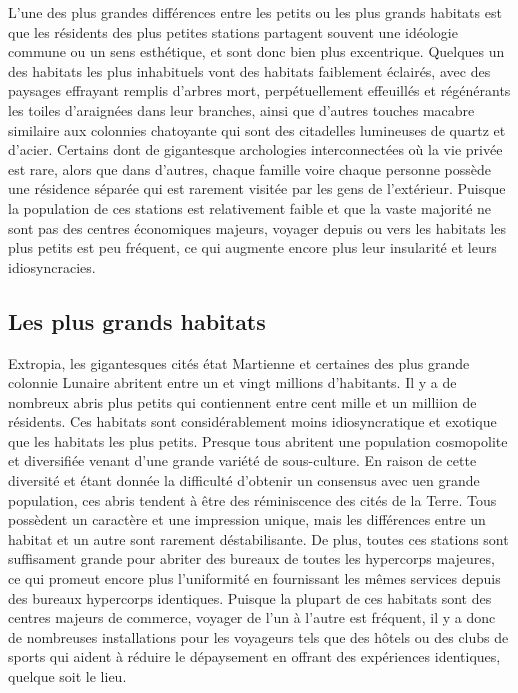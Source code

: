                L'une des plus grandes différences entre les petits ou les plus grands habitats est que les résidents des plus petites stations partagent souvent une idéologie commune ou un sens esthétique, et sont donc bien plus excentrique. Quelques un des habitats les plus inhabituels vont des habitats faiblement éclairés, avec des paysages effrayant remplis d'arbres mort, perpétuellement effeuillés et régénérants les toiles d'araignées dans leur branches, ainsi que d'autres touches macabre similaire aux colonnies chatoyante qui sont des citadelles lumineuses de quartz et d'acier. Certains dont de gigantesque archologies interconnectées où la vie privée est rare, alors que dans d'autres, chaque famille voire chaque personne possède une résidence séparée qui est rarement visitée par les gens de l'extérieur. Puisque la population de ces stations est relativement faible et que la vaste majorité ne sont pas des centres économiques majeurs, voyager depuis ou vers les habitats les plus petits est peu fréquent, ce qui augmente encore plus leur insularité et leurs idiosyncracies. 

               \subsection{Les plus grands habitats} \label{sec:largest-habitats} 

               Extropia, les gigantesques cités état Martienne et certaines des plus grande colonnie Lunaire abritent entre un et vingt millions d'habitants. Il y a de nombreux abris plus petits qui contiennent entre cent mille et un milliion de résidents. Ces habitats sont considérablement moins idiosyncratique et exotique que les habitats les plus petits. Presque tous abritent une population cosmopolite et diversifiée venant d'une grande variété de sous-culture. En raison de cette diversité et étant donnée la difficulté d'obtenir un consensus avec uen grande population, ces abris tendent à être des réminiscence des cités de la Terre. Tous possèdent un caractère et une impression unique, mais les différences entre un habitat et un autre sont rarement déstabilisante. De plus, toutes ces stations sont suffisament grande pour abriter des bureaux de toutes les hypercorps majeures, ce qui promeut encore plus l'uniformité en fournissant les mêmes services depuis des bureaux hypercorps identiques. Puisque la plupart de ces habitats sont des centres majeurs de commerce, voyager de l'un à l'autre est fréquent, il y a donc de nombreuses installations pour les voyageurs tels que des hôtels ou des clubs de sports qui aident à réduire le dépaysement en offrant des expériences identiques, quelque soit le lieu. 

